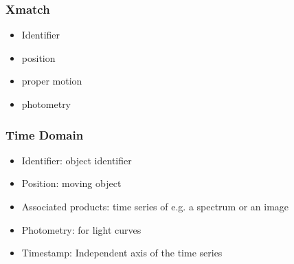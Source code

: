 \documentclass[11pt,a4paper]{ivoa}
\begin{document}
\subsubsection{X\-match}
\begin{itemize}
    \item Identifier
    \item position
    \item proper motion
    \item photometry
\end{itemize}

\subsubsection{Time Domain}
\begin{itemize}
    \item Identifier: object identifier
    \item Position: moving object
    \item Associated products: time series of e.g. a spectrum or an image
    \item Photometry: for light curves
    \item Timestamp: Independent axis of the time series
\end{itemize}
\end{document}
